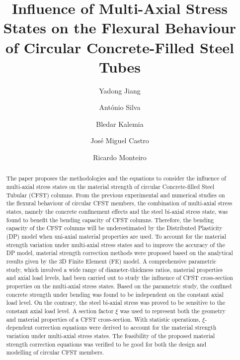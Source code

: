 \documentclass[12pt, A4]{article}
\title{Influence of Multi-Axial Stress States on the Flexural Behaviour of Circular Concrete-Filled Steel Tubes}
\author{Yadong Jiang \and António Silva \and Bledar Kalemia \and José Miguel Castro \and Ricardo Monteiro}
\date{}
\begin{document}
	\maketitle
	
	\begin{abstract}
		The paper proposes the methodologies and the equations to consider the influence of multi-axial stress states on the material strength of circular Concrete-filled Steel Tubular (CFST) columns. From the previous experimental and numerical studies on the flexural behaviour of circular CFST members, the combination of multi-axial stress states, namely the concrete confinement effects and the steel bi-axial stress state, was found to benefit the bending capacity of CFST columns. Therefore, the bending capacity of the CFST columns will be underestimated by the Distributed Plasticity (DP) model when uni-axial material properties are used. To account for the material strength variation under multi-axial stress states and to improve the accuracy of the DP model, material strength correction methods were proposed based on the analytical results given by the 3D Finite Element (FE) model. A comprehensive parametric study, which involved a wide range of diameter-thickness ratios, material properties and axial load levels, had been carried out to study the influence of CFST cross-section properties on the multi-axial stress states. Based on the parametric study, the confined concrete strength under bending was found to be independent on the constant axial load level. On the contrary, the steel bi-axial stress was proved to be sensitive to the constant axial load level. A section factor $\xi$ was used to represent both the geometry and material properties of a CFST cross-section. With statistic operations, $\xi$-dependent correction equations were derived to account for the material strength variation under multi-axial stress states. The feasibility of the proposed material strength correction equations was verified to be good for both the design and modelling of circular CFST members.
	\end{abstract}
\end{document}
